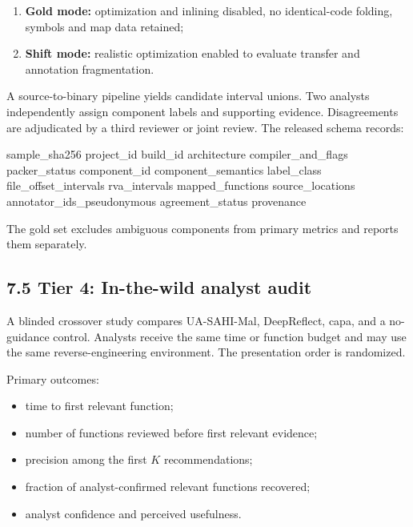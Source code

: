 \documentclass[
  10pt,
]{article}
\newenvironment{Shaded}{}{}
\newcommand{\NormalTok}[1]{#1}
\providecommand{\tightlist}{%
  \setlength{\itemsep}{0pt}\setlength{\parskip}{0pt}}
\begin{document}
\begin{enumerate}
\def\labelenumi{\arabic{enumi}.}
\tightlist
\item
  \textbf{Gold mode:} optimization and inlining disabled, no
  identical-code folding, symbols and map data retained;
\item
  \textbf{Shift mode:} realistic optimization enabled to evaluate
  transfer and annotation fragmentation.
\end{enumerate}

A source-to-binary pipeline yields candidate interval unions. Two
analysts independently assign component labels and supporting evidence.
Disagreements are adjudicated by a third reviewer or joint review. The
released schema records:

\begin{Shaded}
\begin{Highlighting}[]
\NormalTok{sample\_sha256}
\NormalTok{project\_id}
\NormalTok{build\_id}
\NormalTok{architecture}
\NormalTok{compiler\_and\_flags}
\NormalTok{packer\_status}
\NormalTok{component\_id}
\NormalTok{component\_semantics}
\NormalTok{label\_class}
\NormalTok{file\_offset\_intervals}
\NormalTok{rva\_intervals}
\NormalTok{mapped\_functions}
\NormalTok{source\_locations}
\NormalTok{annotator\_ids\_pseudonymous}
\NormalTok{agreement\_status}
\NormalTok{provenance}
\end{Highlighting}
\end{Shaded}

The gold set excludes ambiguous components from primary metrics and
reports them separately.

\subsection{7.5 Tier 4: In-the-wild analyst
audit}\label{tier-4-in-the-wild-analyst-audit}

A blinded crossover study compares UA-SAHI-Mal, DeepReflect, capa, and a
no-guidance control. Analysts receive the same time or function budget
and may use the same reverse-engineering environment. The presentation
order is randomized.

Primary outcomes:

\begin{itemize}
\tightlist
\item
  time to first relevant function;
\item
  number of functions reviewed before first relevant evidence;
\item
  precision among the first \(K\) recommendations;
\item
  fraction of analyst-confirmed relevant functions recovered;
\item
  analyst confidence and perceived usefulness.
\end{itemize}
\end{document}
